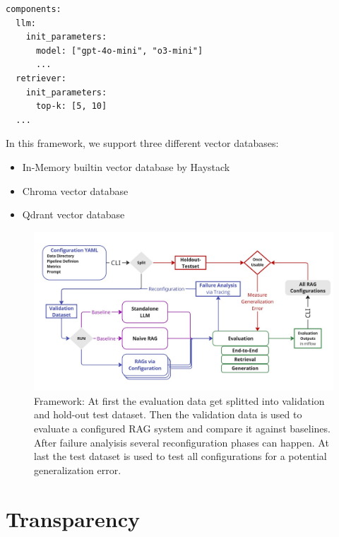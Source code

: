 \begin{verbatim}
components:
  llm:
    init_parameters:
      model: ["gpt-4o-mini", "o3-mini"]
      ...
  retriever:
    init_parameters:
      top-k: [5, 10]
  ...
\end{verbatim}

In this framework, we support three different vector databases:
\begin{itemize}
  \item In-Memory builtin vector database by Haystack
  \item Chroma vector database\cite{Chroma}
  \item Qdrant vector database\cite{qdrant}
\end{itemize}

\begin{figure}[h]
  \centering
  \includegraphics[width=\textwidth]{images/FrameworkFull.pdf}
  \caption{Framework: At first the evaluation data get splitted into validation and hold-out test dataset. Then the validation data is used to evaluate a configured RAG system and compare it against baselines. After failure analyisis several reconfiguration phases can happen. At last the test dataset is used to test all configurations for a potential generalization error.}
  \label{fig:framework-full}
\end{figure}


\section{Transparency}

